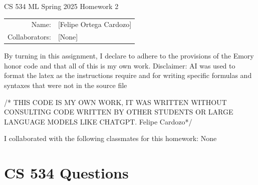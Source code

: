 \documentclass[a4paper,12pt]{article}
\begin{document}
\begin{center}
{\Large CS 534 ML Spring 2025 Homework 2}
\vspace{.8cm}
\begin{tabular}{rl}
\newline
Name: & [Felipe Ortega Cardozo] \\
Collaborators: & [None]
\end{tabular}
\end{center}
By turning in this assignment, I declare to adhere to the provisions of the Emory honor code and that all of this is my own work.
Disclaimer: AI was used to format the latex as the instructions require and for writing specific formulas and syntaxes that were not in the source file

/* THIS CODE IS MY OWN WORK, IT WAS WRITTEN WITHOUT
CONSULTING CODE WRITTEN BY OTHER STUDENTS
OR LARGE LANGUAGE MODELS LIKE CHATGPT.
Felipe Cardozo*/

I collaborated with the following classmates for this homework:
None
\section*{CS 534 Questions}
\end{document}
